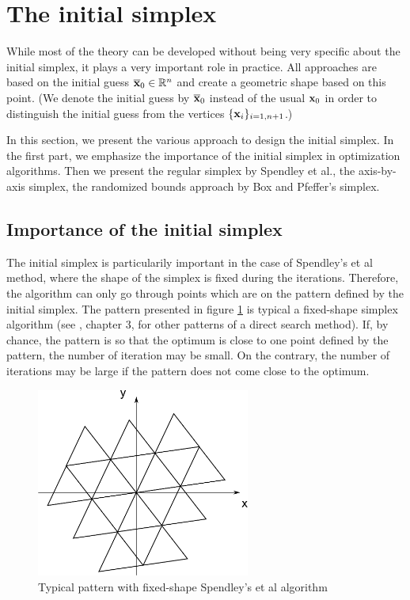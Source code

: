 \section{The initial simplex}

While most of the theory can be developed without being very specific 
about the initial simplex, it plays a very important role in practice.
All approaches are based on the initial guess $\overline{\mathbf{x}}_0\in\mathbb{R}^n$ and create a 
geometric shape based on this point.
(We denote the initial guess by $\overline{\mathbf{x}}_0$ instead of the usual $\mathbf{x}_0$
in order to distinguish the initial guess from the vertices $\{\mathbf{x}_i\}_{i=1,n+1}$.)


In this section, we present the various approach to design the initial 
simplex. In the first part, we emphasize the importance of the initial
simplex in optimization algorithms. Then we present the regular simplex 
by Spendley et al., the axis-by-axis simplex, the randomized bounds approach by Box and 
Pfeffer's simplex.

\subsection{Importance of the initial simplex}

The initial simplex is particularily important in the case of Spendley's et al 
method, where the shape of the simplex is fixed during the iterations.
Therefore, the algorithm can only go through points which are on the pattern
defined by the initial simplex. The pattern presented in figure \ref{fig-nm-simplex-fixedshape}
is typical a fixed-shape simplex algorithm (see \cite{Torczon89multi-directionalsearch}, chapter 3, 
for other patterns of a direct search method).
If, by chance, the pattern is so that the optimum is close to one point 
defined by the pattern, the number of iteration may be small. On the contrary, the 
number of iterations may be large if the pattern does not come close to the 
optimum.

\begin{figure}
\begin{center}
\includegraphics[width=7cm]{simplex_initialfixed.pdf}
\end{center}
\caption{Typical pattern with fixed-shape Spendley's et al algorithm}
\label{fig-nm-simplex-fixedshape}
\end{figure}

